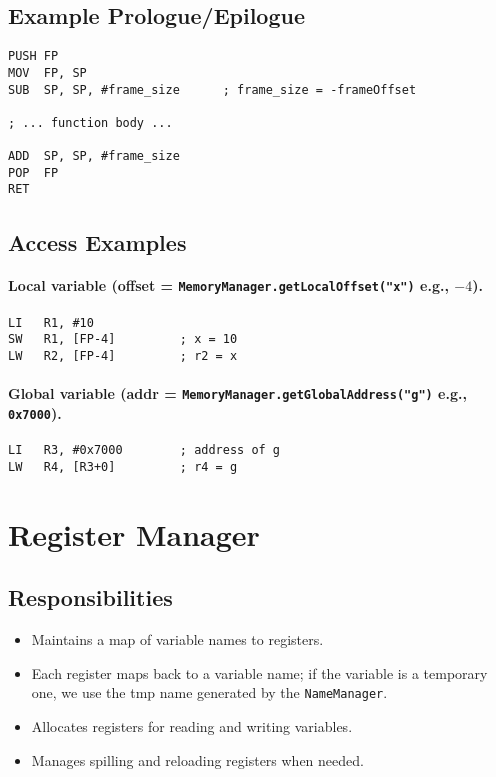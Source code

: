 \documentclass[12pt,a4paper]{report}
\begin{document}
\subsection{Example Prologue/Epilogue}
\begin{lstlisting}[language=SAYACasm, style=code, caption={Prologue/Epilogue sketch}]
PUSH FP
MOV  FP, SP
SUB  SP, SP, #frame_size      ; frame_size = -frameOffset

; ... function body ...

ADD  SP, SP, #frame_size
POP  FP
RET
\end{lstlisting}

\subsection{Access Examples}
\paragraph{Local variable (offset = \texttt{MemoryManager.getLocalOffset("x")} e.g., \(-4\)).}
\begin{lstlisting}[language=SAYACasm, style=code]
LI   R1, #10
SW   R1, [FP-4]         ; x = 10
LW   R2, [FP-4]         ; r2 = x
\end{lstlisting}

\paragraph{Global variable (addr = \texttt{MemoryManager.getGlobalAddress("g")} e.g., \texttt{0x7000}).}
\begin{lstlisting}[language=SAYACasm, style=code]
LI   R3, #0x7000        ; address of g
LW   R4, [R3+0]         ; r4 = g
\end{lstlisting}


\section{Register Manager}

\subsection{Responsibilities}
\begin{itemize}
    \item Maintains a map of variable names to registers. 
    \item Each register maps back to a variable name; if the variable is a temporary one, 
          we use the tmp name generated by the \texttt{NameManager}.
    \item Allocates registers for reading and writing variables.
    \item Manages spilling and reloading registers when needed.
\end{itemize}
\end{document}
